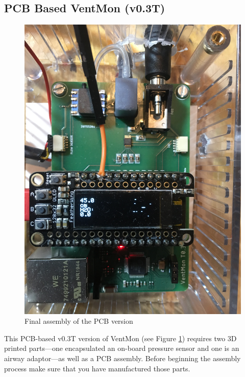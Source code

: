 \documentclass[11pt, letterpaper]{article}
\begin{document}

\subsection{PCB Based VentMon (v0.3T)}


\begin{figure}[H]
\centering
\includegraphics[width=\textwidth]{PCBVentMon.JPG}
\caption{Final assembly of the PCB version}
\label{fig:finalPCB}
\end{figure}

This PCB-based v0.3T version of VentMon (see Figure \ref{fig:finalPCB}) requires two 3D printed parts---one encapsulated an on-board pressure sensor and one is an airway adaptor---as well as a PCB assembly. Before beginning the assembly process make sure that you have manufactured those parts.
\end{document}
